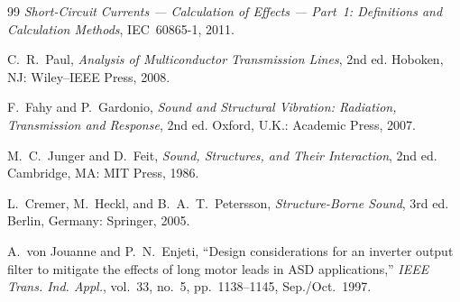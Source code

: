 \documentclass[11pt,a4paper,oneside]{book}
\begin{document}
\begin{thebibliography}{99}
	 \emph{Short-Circuit Currents --- Calculation of Effects ---
		Part~1: Definitions and Calculation Methods}, IEC~60865-1, 2011.
	
	 C.~R.~Paul, \emph{Analysis of Multiconductor Transmission Lines},
	2nd ed. Hoboken, NJ: Wiley--IEEE Press, 2008.
	
	 F.~Fahy and P.~Gardonio, \emph{Sound and Structural Vibration:
		Radiation, Transmission and Response}, 2nd ed. Oxford, U.K.: Academic Press, 2007.
	
	 M.~C.~Junger and D.~Feit, \emph{Sound, Structures, and Their
		Interaction}, 2nd ed. Cambridge, MA: MIT Press, 1986.
	
	 L.~Cremer, M.~Heckl, and B.~A.~T.~Petersson,
	\emph{Structure-Borne Sound}, 3rd ed. Berlin, Germany: Springer, 2005.
	
	 A.~von Jouanne and P.~N.~Enjeti, ``Design considerations for
	an inverter output filter to mitigate the effects of long motor leads in ASD
	applications,'' \emph{IEEE Trans. Ind. Appl.}, vol.~33, no.~5, pp.~1138--1145,
	Sep./Oct.~1997.
	
	
\end{thebibliography}

\end{document}
